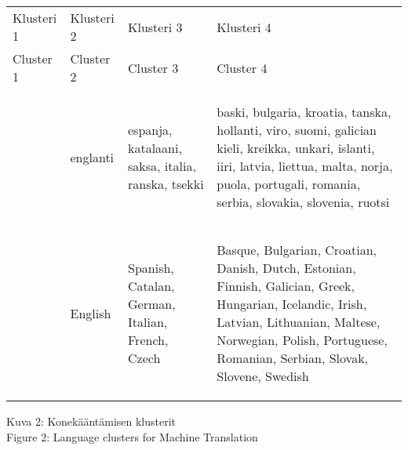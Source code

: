 \documentclass[]{../../metanetpaper}
\begin{document}
\begin{Parallel}[c]{77mm}{77mm}
\begin{center}
\begin{tabular}{|p{2cm}|p{2cm}|p{3cm}|p{6cm}|}
Klusteri 1 & Klusteri 2 & Klusteri 3 & Klusteri 4 \\
Cluster 1  & Cluster 2  & Cluster 3  & Cluster 4 \\ \hline

&
   \begin{center}
                              englanti
   \end{center}
&
   \begin{center}
    espanja, katalaani, saksa, italia, ranska, tsekki
   \end{center}
&
   \begin{center}
   baski, bulgaria, kroatia, tanska, hollanti, viro, suomi, galician kieli,
     kreikka, unkari, islanti, iiri, latvia, liettua, malta, norja, puola,
            portugali, romania, serbia, slovakia, slovenia, ruotsi
   \end{center}
\\

&
   \begin{center}
                                    English
   \end{center}
&
   \begin{center}
Spanish, Catalan, German, Italian, French, Czech
   \end{center}
&
   \begin{center}
Basque, Bulgarian, Croatian, Danish, Dutch, Estonian, Finnish, Galician, Greek,
 Hungarian, Icelandic, Irish, Latvian, Lithuanian, Maltese, Norwegian, Polish,
            Portuguese, Romanian, Serbian, Slovak, Slovene, Swedish
   \end{center}
\end{tabular}

Kuva 2: Konekääntämisen klusterit \\
Figure 2: Language clusters for Machine Translation
\end{center}
\end{Parallel}
\end{document}
